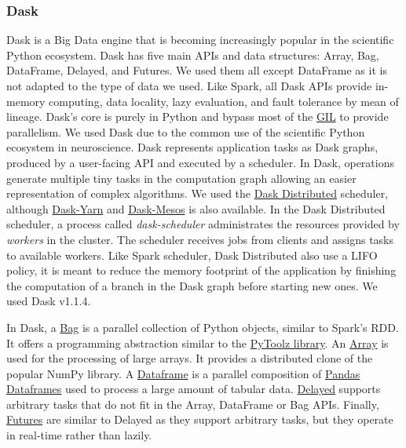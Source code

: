 \documentclass[conference]{IEEEtran}
\begin{document}
\subsubsection{Dask} Dask is a Big Data engine that is becoming increasingly popular
in the scientific Python ecosystem. Dask has five main APIs and data structures:
Array, Bag, DataFrame, Delayed, and Futures. We used them all except DataFrame as it
is not adapted to the type of data we used. Like Spark, all Dask APIs provide
in-memory computing, data locality, lazy evaluation, and fault tolerance by mean of
lineage. Dask's core is purely in Python and bypass most of the
\href{https://docs.python.org/3/glossary.html#term-gil}{GIL} to provide parallelism.
We used Dask due to the common use of the scientific Python ecosystem in
neuroscience. Dask represents application tasks as Dask graphs, produced by a
user-facing API and executed by a scheduler. In Dask, operations generate multiple
tiny tasks in the computation graph allowing an easier representation of complex
algorithms. We used the \href{https://distributed.dask.org/en/latest/index.html}{Dask
Distributed} scheduler, although \href{https://github.com/dask/dask-yarn}{Dask-Yarn}
and \href{https://github.com/mrocklin/dask-mesos}{Dask-Mesos} is also available. In
the Dask Distributed scheduler, a process called \textit{dask-scheduler}
administrates the resources provided by \textit{workers} in the cluster. The
scheduler receives jobs from clients and assigns tasks to available workers. Like
Spark scheduler, Dask Distributed also use a LIFO policy, it is meant to reduce the
memory footprint of the application by finishing the computation of a branch in the
Dask graph before starting new ones. We used Dask v1.1.4. 

In Dask, a \href{https://docs.dask.org/en/latest/bag.html}{Bag} is a parallel
collection of Python objects, similar to Spark's RDD. It offers a programming
abstraction similar to the \href{https://toolz.readthedocs.io/en/latest/}{PyToolz
library}. An \href{https://docs.dask.org/en/latest/array.html}{Array} is used for the
processing of large arrays. It provides a distributed clone of the popular NumPy
library. A \href{https://docs.dask.org/en/latest/dataframe.html}{Dataframe} is a
parallel composition of
\href{http://pandas.pydata.org/pandas-docs/stable/reference/api/pandas.DataFrame.html}{Pandas
Dataframes} used to process a large amount of tabular data.
\href{https://docs.dask.org/en/latest/delayed.html}{Delayed} supports arbitrary tasks
that do not fit in the Array, DataFrame or Bag APIs. Finally,
\href{https://docs.dask.org/en/latest/futures.html}{Futures} are similar to Delayed
as they support arbitrary tasks, but they operate in real-time rather than lazily.
\end{document}

